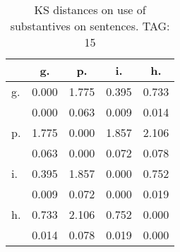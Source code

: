 \begin{table}[h!]
\begin{center}
\begin{tabular}{| l | c | c | c | c |}\hline
 & g. & p. & i. & h. \\\hline
g. & 0.000  & 1.775  & 0.395  & 0.733 \\\hline
 & 0.000  & 0.063  & 0.009  & 0.014 \\\hline
p. & 1.775  & 0.000  & 1.857  & 2.106 \\\hline
 & 0.063  & 0.000  & 0.072  & 0.078 \\\hline
i. & 0.395  & 1.857  & 0.000  & 0.752 \\\hline
 & 0.009  & 0.072  & 0.000  & 0.019 \\\hline
h. & 0.733  & 2.106  & 0.752  & 0.000 \\\hline
 & 0.014  & 0.078  & 0.019  & 0.000 \\\hline
\end{tabular}
\caption{KS distances on use of substantives on sentences. TAG: 15}
\end{center}
\end{table}